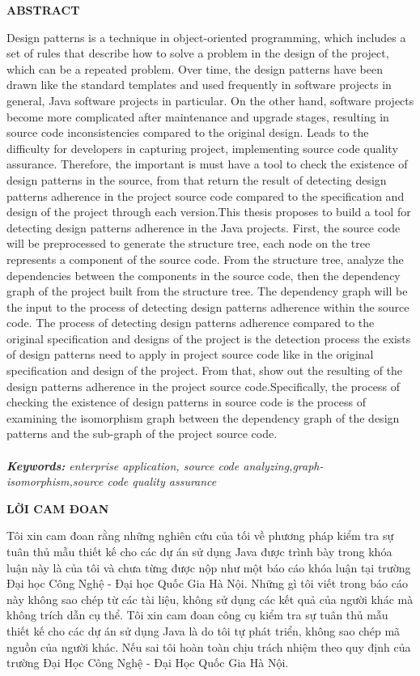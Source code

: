 \documentclass[12pt]{report}
\begin{document}
\newpage
\begin{center}
	\textbf{\large ABSTRACT}
\end{center}
Design patterns is a technique in object-oriented programming, which includes a set of rules that describe how to solve a problem in the design of the project, which can be a repeated problem. Over time, the design patterns have been drawn like the standard templates and used frequently in software projects in general, Java software projects in particular. On the other hand, software projects become more complicated after maintenance and upgrade stages,  resulting in source code inconsistencies compared to the original design. Leads to the difficulty for developers in capturing project, implementing source code quality assurance. Therefore, the important is must have a tool to check the existence of design patterns in the source, from that return the result of detecting design patterns adherence in the project source code compared to the specification and design of the project through each version.This thesis proposes to build a tool for detecting design patterns adherence in the Java projects. First, the source code will be preprocessed to generate the structure tree, each node on the tree represents a component of the source code. From the structure tree, analyze the dependencies between the components in the source code, then the dependency graph of the project built from the structure tree. The dependency graph will be the input to the process of detecting design patterns adherence within the source code. The process of detecting design patterns adherence compared to the original specification and designs of the project is the detection process the exists of design patterns need to apply in project source code like in the original specification and design of the project. From that,  show out the resulting of the design patterns adherence in the project source code.Specifically, the process of checking the existence of design patterns in source code is the process of examining the isomorphism graph between the dependency graph of the design patterns and the sub-graph of the project source code.\\\\
\noindent \textit{\textbf{Keywords:} enterprise application, source code analyzing,graph-isomorphism,source code quality assurance}

\newpage
\begin{center}
	\textbf{\large LỜI CAM ĐOAN}
\end{center}
Tôi xin cam đoan rằng những nghiên cứu của tối về phương pháp kiểm tra sự tuân thủ mẫu thiết kế cho các dự án sử dụng Java được trình bày trong khóa luận này là của tôi và chưa từng được nộp như một báo cáo khóa luận tại trường Đại học Công Nghệ - Đại học Quốc Gia Hà Nội. Những gì tôi viết trong báo cáo này không sao chép từ các tài liệu, không sử dụng các kết quả của người khác mà không trích dẫn cụ thể. Tôi xin cam đoan công cụ kiểm tra sự tuân thủ mẫu thiết kế cho các dự án sử dụng Java là do tôi tự phát triển, không sao chép mã nguồn của người khác. Nếu sai tôi hoàn toàn chịu trách nhiệm theo quy định của trường Đại Học Công Nghệ - Đại Học Quốc Gia Hà Nội.
\end{document}
